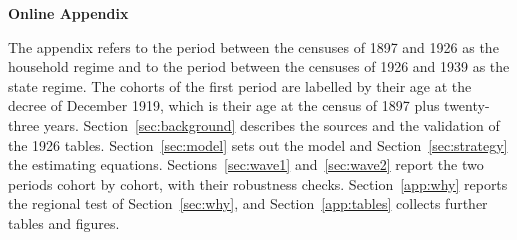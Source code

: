 \documentclass[12pt]{article}
\begin{document}
\clearpage



\clearpage
\appendix
\setcounter{table}{0}
\setcounter{figure}{0}
\setcounter{equation}{0}
\begin{center}{\Large\bfseries Online Appendix}\end{center}

\noindent The appendix refers to the period between the censuses of 1897 and 1926 as the household regime and to the period between the censuses of 1926 and 1939 as the state regime. The cohorts of the first period are labelled by their age at the decree of December 1919, which is their age at the census of 1897 plus twenty-three years. Section~\ref{sec:background} describes the sources and the validation of the 1926 tables. Section~\ref{sec:model} sets out the model and Section~\ref{sec:strategy} the estimating equations. Sections~\ref{sec:wave1} and~\ref{sec:wave2} report the two periods cohort by cohort, with their robustness checks. Section~\ref{app:why} reports the regional test of Section~\ref{sec:why}, and Section~\ref{app:tables} collects further tables and figures.


\end{document}
